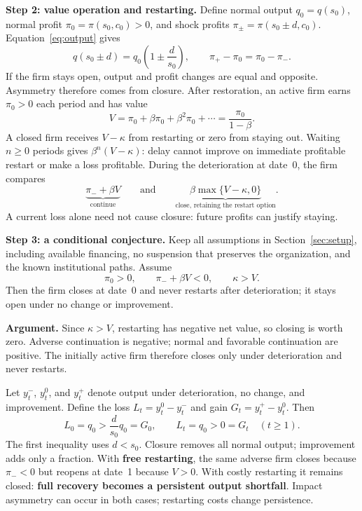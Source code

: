 \documentclass[11pt,letterpaper]{article}
\begin{document}
\newpage
\textbf{Step 2: value operation and restarting.} Define normal output $q_0=q(s_0)$,
normal profit $\pi_0=\pi(s_0,c_0)>0$, and shock profits
$\pi_\pm=\pi(s_0\pm d,c_0)$. Equation~\eqref{eq:output} gives
\begin{equation}\label{eq:symmetry}
q(s_0\pm d)=q_0\left(1\pm\frac d{s_0}\right),
\qquad \pi_+-\pi_0=\pi_0-\pi_-.
\end{equation}
If the firm stays open, output and profit changes are equal and opposite.
Asymmetry therefore comes from closure. After restoration, an active firm
earns $\pi_0>0$ each period and has value
\begin{equation}\label{eq:value}
V=\pi_0+\beta\pi_0+\beta^2\pi_0+\cdots=\frac{\pi_0}{1-\beta}.
\end{equation}
A closed firm receives $V-\kappa$ from restarting or zero from staying out.
Waiting $n\geq0$ periods gives $\beta^n(V-\kappa)$: delay cannot improve on
immediate profitable restart or make a loss profitable. During the deterioration
at date~0, the firm compares
\begin{equation}\label{eq:closure}
\underbrace{\pi_-+\beta V}_{\text{continue}}
\qquad\text{and}\qquad
\underbrace{\beta\max\{V-\kappa,0\}}_{\text{close, retaining the restart option}}.
\end{equation}
A current loss alone need not cause closure: future profits can justify staying.

\textbf{Step 3: a conditional conjecture.} Keep all assumptions in
Section~\ref{sec:setup}, including available financing, no suspension that
preserves the organization, and the known institutional paths.
Assume
\begin{equation}\label{eq:conditions}
\boxed{\pi_0>0,\qquad\pi_-+\beta V<0,\qquad\kappa>V.}
\end{equation}
Then the firm closes at date~0 and never restarts after deterioration; it stays
open under no change or improvement.

\textbf{Argument.} Since $\kappa>V$, restarting has negative net value,
so closing is worth zero. Adverse continuation is negative;
normal and favorable continuation are positive. The initially active firm
therefore closes only under deterioration and never restarts.

Let $y_t^-$, $y_t^0$, and $y_t^+$ denote output under deterioration, no change,
and improvement. Define the loss $L_t=y_t^0-y_t^-$ and gain $G_t=y_t^+-y_t^0$. Then
\begin{equation}\label{eq:dominance}
L_0=q_0>\frac d{s_0}q_0=G_0,\qquad
L_t=q_0>0=G_t\quad(t\geq1).
\end{equation}
The first inequality uses $d<s_0$. Closure removes all normal output; improvement
adds only a fraction. With \textbf{free restarting}, the same adverse firm closes
because $\pi_-<0$ but reopens at date~1 because $V>0$. With costly restarting
it remains closed: \textbf{full recovery becomes a persistent output shortfall}.
Impact asymmetry can occur in both cases; restarting costs change persistence.
\end{document}
